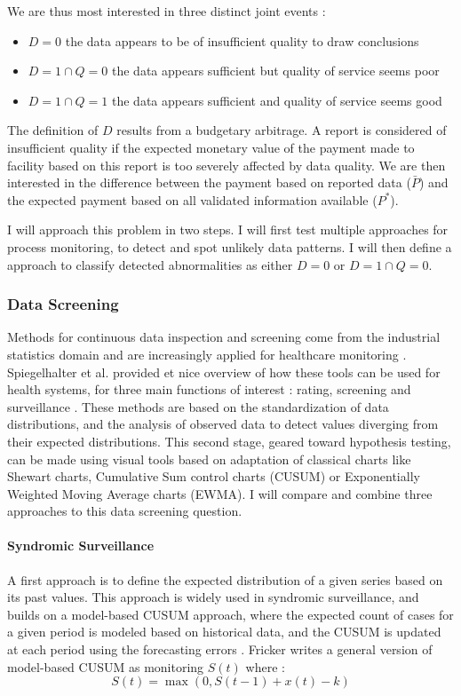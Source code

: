 We are thus most interested in three distinct joint events :
\begin{itemize}
	\item $D = 0$ the data appears to be of insufficient quality to draw conclusions
	\item $D = 1 \cap Q = 0$ the data appears sufficient but quality of service seems poor
	\item $D = 1 \cap Q = 1$ the data appears sufficient and quality of service seems good
\end{itemize}


The definition of $D$ results from a budgetary arbitrage. A report is considered of insufficient quality if the expected monetary value of the payment made to facility based on this report is too severely affected by data quality. We are then interested in the difference between the payment based on reported data ($\bar{P}$) and the expected payment based on all validated information available ($P^{*}$).


I will approach this problem in two steps. I will first test multiple approaches for process monitoring, to detect and spot unlikely data patterns. I will then define a approach to classify detected abnormalities as either $D = 0$ or $D = 1 \cap Q = 0$.

\subsubsection{Data Screening}

Methods for continuous data inspection and screening come from the industrial statistics domain and are increasingly applied for healthcare monitoring \citep{woodall_use_2006,woodall_current_2014}. Spiegelhalter et al. provided et nice overview of how these tools can be used for health systems, for three main functions of interest : rating, screening and surveillance \citep{spiegelhalter_statistical_2012}. These methods are based on the standardization of data distributions, and the analysis of observed data to detect values diverging from their expected distributions. This second stage, geared toward hypothesis testing, can be made using visual tools based on adaptation of classical charts like Shewart charts, Cumulative Sum control charts (CUSUM) or Exponentially Weighted Moving Average charts (EWMA). I will compare and combine three approaches to this data screening question.

\paragraph{Syndromic Surveillance} A first approach is to define the expected distribution of a given series based on its past values. This approach is widely used in syndromic surveillance, and builds on a model-based CUSUM approach, where the expected count of cases for a given period is modeled based on historical data, and the CUSUM is updated at each period using the forecasting errors \citep{fricker_comparing_2008}. Fricker writes a general version of model-based CUSUM as monitoring $S(t)$ where :
$$ S(t) = \max(0 , S(t-1) + x(t) - k)$$

